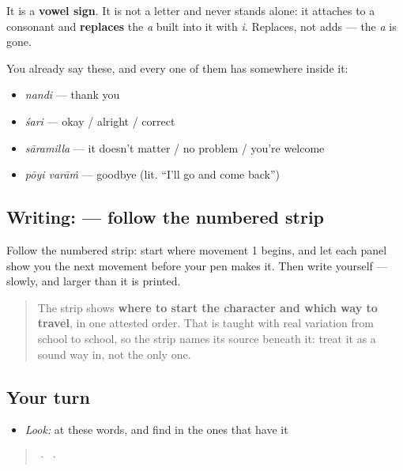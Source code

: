 It is a \textbf{vowel sign}. It is not a letter and never stands alone: it attaches to a consonant and \textbf{replaces} the \emph{a} built into it with \emph{i}. Replaces, not adds — the \emph{a} is gone.

You already say these, and every one of them has  somewhere inside it:

\begin{itemize}
\raggedright
  \item \textbf{} \emph{nandi} — thank you
  \item \textbf{} \emph{śari} — okay / alright / correct
  \item \textbf{} \emph{sāramilla} — it doesn't matter / no problem / you're welcome
  \item \textbf{ } \emph{pōyi varāṁ} — goodbye (lit. \textquotedblleft{}I'll go and come back\textquotedblright{})
\end{itemize}

\subsection*{Writing:  — follow the numbered strip}

Follow the numbered strip: start where movement 1 begins, and let each panel show you the next movement before your pen makes it. Then write  yourself — slowly, and larger than it is printed.

\begin{quote}
The strip shows \textbf{where to start the character and which way to travel}, in one attested order. That is taught with real variation from school to school, so the strip names its source beneath it: treat it as a sound way in, not the only one.
\end{quote}

\subsection*{Your turn}
\begin{itemize}
\raggedright
  \item \emph{Look:} at these words, and find  in the ones that have it
\end{itemize}

\begin{quote}
  ·    ·  
\end{quote}

